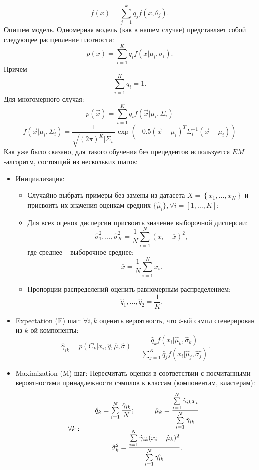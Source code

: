 \documentclass[12pt]{report}
\begin{document}
\[
    f(x) = \sum\limits_{j=1}^k q_j f(x, \theta_j).  
\]
Опишем модель. Одномерная модель (как в нашем случае) представляет собой следующее расщепление плотности:
\[
    p(x) = \sum\limits_{i=1}^K q_i f(x| \mu_i, \sigma_i).
\]
Причем
\[
    \sum\limits_{i=1}^K q_i = 1.
\]
Для многомерного случая:
\[
    p(\vec{x}) = \sum\limits_{i=1}^K q_i f(\vec{x}| \mu_i, \Sigma_i)
\]
\[
    f(\vec{x}| \mu_i, \Sigma_i) = \dfrac{1}{\sqrt{(2\pi)^K |\Sigma_i|}} \exp\left(-0.5(\vec{x} - \mu_i)^T \Sigma^{-1}_i (\vec{x} - \mu_i)\right)
\]
Как уже было сказано, для такого обучения без прецедентов используется $EM$-алгоритм, состоящий из нескольких шагов:
\begin{itemize}
  \item Инициализация:
  \begin{itemize}
    \item Случайно выбрать примеры без замены из датасета $X = \left\{x_1, \ldots, x_N\right\}$ и присвоить их значения оценкам средних $\{\hat{\mu}_i\}, \forall i = [1, \ldots, K]$;
    \item Для всех оценок дисперсии присвоить значение выборочной дисперсии:
    \[
      \hat{\sigma}_1^2,\ldots, \hat{\sigma}_K^2=\frac{1}{N}\sum_{i=1}^N (x_i - \overline{x})^2,
    \]
    где среднее -- выборочное среднее:
    \[
        \overline{x} = \dfrac{1}{N} \sum\limits_{i=1}^N x_i.
    \]
    \item Пропорции распределений оценить равномерным распределением:
    \[
        \hat{q}_1, \ldots, \hat{q}_2 = \dfrac{1}{K}.
    \]
  \end{itemize}
  \item Expectation (E) шаг:
  $\forall  i, k$ оценить вероятность, что $i$-ый сэмпл сгенерирован из $k$-ой компоненты:
  \[
    \hat{\gamma}_{ik} = p(C_k | x_i, \hat{q}, \hat{\mu}, \hat{\sigma}) = \dfrac{\hat{q}_k f(x_i | \hat{\mu}_k, \hat{\sigma}_k)}{\sum\limits_{j=1}^K \hat{q}_j f(x_i | \hat{\mu}_j, \hat{\sigma_j})}.
  \]
  \item Maximization (M) шаг:
  Пересчитать оценки в соответствии с посчитанными вероятностями принадлежности сэмплов к классам (компонентам, кластерам):
  \[
      \forall k: \hspace*{0.5cm} \begin{array}{c}
        \hat{q}_k = \sum\limits_{i=1}^N \dfrac{\hat{\gamma}_{ik}}{N}; \hspace*{1cm}
        \hat{\mu}_k = \dfrac{\sum\limits_{i=1}^N \hat{\gamma}_{ik}x_i}{\sum\limits_{i=1}^N \hat{\gamma}_{ik}} \\[0.5cm]
        \hat{\sigma}^2_k = \dfrac{\sum\limits_{i=1}^N \hat{\gamma}_{ik}(x_i - \hat{\mu}_k)^2}{\sum\limits_{i=1}^N \hat{\gamma_{ik}}}.
      \end{array}    
  \]
\end{itemize}
\end{document}
